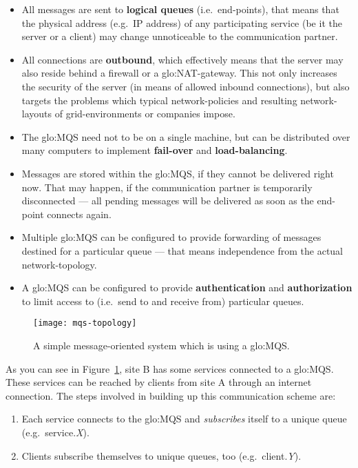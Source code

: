 \begin{itemize}
\item All messages are  sent to \textbf{logical queues} (i.e.~end-points),
  that  means   that  the  physical  address  (e.g.~IP   address)  of  any
  participating  service  (be  it  the  server or  a  client)  may  change
  unnoticeable to the communication partner.
\item All connections are  \textbf{outbound}, which effectively means that
  the server may also reside behind a firewall or a \gls{glo:NAT}-gateway.
  This not only increases the security  of the server (in means of allowed
  inbound  connections),  but  also  targets the  problems  which  typical
  network-policies and  resulting network-layouts of  grid-environments or
  companies impose.
\item The  \gls{glo:MQS} need not  to be on  a single machine, but  can be
  distributed  over  many computers  to  implement \textbf{fail-over}  and
  \textbf{load-balancing}.
\item  Messages are  stored within  the \gls{glo:MQS},  if they  cannot be
  delivered right now.   That may happen, if the  communication partner is
  temporarily disconnected  --- all pending messages will  be delivered as
  soon as the end-point connects again.
\item Multiple  \gls{glo:MQS} can be  configured to provide  forwarding of
  messages  destined for a  particular queue  --- that  means independence
  from the actual network-topology.
\item A \gls{glo:MQS} can be configured to provide \textbf{authentication}
  and \textbf{authorization} to limit  access to (i.e.~send to and receive
  from) particular queues.
\end{itemize}

\begin{figure}[htbp]
  \centering
  \texttt{[image: mqs-topology]}
  \caption[Example MQS topology]{A simple message-oriented system which is
    using a \gls{glo:MQS}.}
  \label{fig:mqs-topology}
\end{figure}

As you can see in  Figure~\ref{fig:mqs-topology}, site B has some services
connected to  a \gls{glo:MQS}.  These services can  be reached  by clients
from site A through an internet connection. The steps involved in building
up this communication scheme are:
\begin{enumerate}
\item  Each service  connects to  the \gls{glo:MQS}  and \emph{subscribes}
  itself to a unique queue (e.g.~service.\emph{X}).
\item    Clients   subscribe    themselves   to    unique    queues,   too
  (e.g.~client.\emph{Y}).
\end{enumerate}

